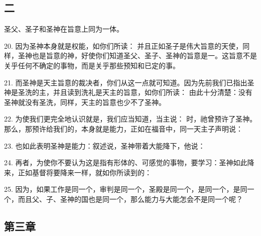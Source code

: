 
\subsection{二}

圣父、圣子和圣神在旨意上同为一体。\par

20. 因为圣神本身就是权能，如你们所读： 并且正如圣子是伟大旨意的天使，同样，圣神也是旨意的神，好使你们知道圣父、圣子、圣神的旨意是一。这旨意不是关乎任何不确定的事物，而是关乎那些预知和已定的事。\par

21. 而圣神是天主旨意的裁决者，你们从这一点就可知道。因为先前我们已指出圣神是圣洗的主，并且读到洗礼是天主的旨意，如你们所读： 由此十分清楚：没有圣神就没有圣洗，同样，天主的旨意也少不了圣神。\par

22. 为使我们更完全地认识就是，我们应当知道，当主说： 时，祂曾预许了圣神。那么，那预许给我们的，本身就是能力，正如在福音中，同一天主子声明说：\par

23. 也如此表明圣神是能力：叙述说，圣神带着大能降下，他说：\par

24. 再者，为使你不要认为这是指有形体的、可感觉的事物，要学习：圣神如此降来，正如基督将要降来一样，就如你所读到的：\par

25. 因为，如果工作是同一个，审判是同一个，圣殿是同一个，是同一个，是同一个，而且父、子、圣神的国也是同一个，那么能力与大能怎会不是同一个呢？\par


\subsection{第三章}

